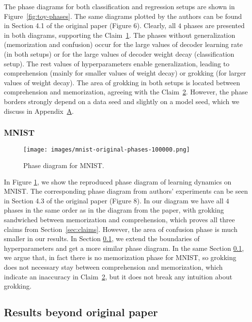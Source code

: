 The phase diagrams for both classification and regression setups are shown in Figure~\ref{fig:toy-phases}. The same diagrams plotted by the authors can be found in Section 4.1 of the original paper (Figure 6). Clearly, all $4$ phases are presented in both diagrams, supporting the Claim~\hyperref[claim:1]{1}. The phases without generalization (memorization and confusion) occur for the large values of decoder learning rate (in both setups) or for the large values of decoder weight decay (classification setup). The rest values of hyperparameters enable generalization, leading to comprehension (mainly for smaller values of weight decay) or grokking (for larger values of weight decay). The area of grokking in both setups is located between comprehension and memorization, agreeing with the Claim~\hyperref[claim:2]{2}. However, the phase borders strongly depend on a data seed and slightly on a model seed, which we discuss in Appendix~\hyperref[app:A]{A}.

\subsubsection{MNIST}

\begin{figure}[h]
\caption{Phase diagram for MNIST.}
\centering
\texttt{[image: images/mnist-original-phases-100000.png]}
\label{fig:mnist-phases}
\end{figure}

In Figure \ref{fig:mnist-phases}, we show the reproduced phase diagram of learning dynamics on MNIST. The corresponding phase diagram from authors' experiments can be seen in Section 4.3 of the original paper (Figure 8). In our diagram we have all $4$ phases in the same order as in the diagram from the paper, with grokking sandwiched between memorization and comprehension, which proves all three claims from Section~\ref{sec:claims}. However, the area of confusion phase is much smaller in our results. In Section \ref{sec:additional-results}, we extend the boundaries of hyperparameters and get a more similar phase diagram.
In the same Section \ref{sec:additional-results}, we argue that, in fact there is no memorization phase for MNIST, so grokking does not necessary stay between comprehension and memorization, which indicate an inaccuracy in Claim~\hyperref[claim:2]{2}, but it does not break any intuition about grokking.

\subsection{Results beyond original paper}
\label{sec:additional-results}

